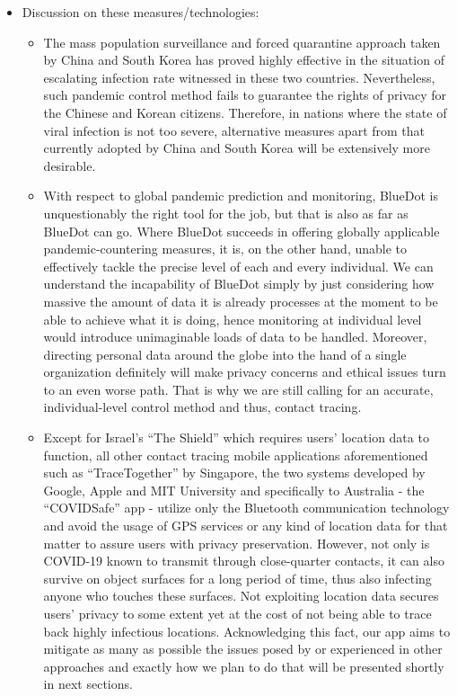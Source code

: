 \begin{itemize}
        \item Discussion on these measures/technologies:
        \begin{itemize}
          \item The mass population surveillance and forced quarantine approach taken by China and South Korea has proved highly effective in the situation of escalating infection rate witnessed in these two countries. Nevertheless, such pandemic control method fails to guarantee the rights of privacy for the Chinese and Korean citizens. Therefore, in nations where the state of viral infection is not too severe, alternative measures apart from that currently adopted by China and South Korea will be extensively more desirable.
          \item With respect to global pandemic prediction and monitoring, BlueDot is unquestionably the right tool for the job, but that is also as far as BlueDot can go. Where BlueDot succeeds in offering globally applicable pandemic-countering measures, it is, on the other hand, unable to effectively tackle the precise level of each and every individual. We can understand the incapability of BlueDot simply by just considering how massive the amount of data it is already processes at the moment to be able to achieve what it is doing, hence monitoring at individual level would introduce unimaginable loads of data to be handled. Moreover, directing personal data around the globe into the hand of a single organization definitely will make privacy concerns and ethical issues turn to an even worse path. That is why we are still calling for an accurate, individual-level control method and thus, contact tracing.
          \item Except for Israel's ``The Shield'' which requires users' location data to function, all other contact tracing mobile applications aforementioned such as ``TraceTogether'' by Singapore, the two systems developed by Google, Apple and MIT University and specifically to Australia - the ``COVIDSafe'' app \parencite{CovidSafe} - utilize only the Bluetooth communication technology and avoid the usage of GPS services or any kind of location data for that matter to assure users with privacy preservation. However, not only is COVID-19 known to transmit through close-quarter contacts, it can also survive on object surfaces for a long period of time, thus also infecting anyone who touches these surfaces. Not exploiting location data secures users' privacy to some extent yet at the cost of not being able to trace back highly infectious locations. Acknowledging this fact, our app aims to mitigate as many as possible the issues posed by or experienced in other approaches and exactly how we plan to do that will be presented shortly in next sections.
        \end{itemize}
      \end{itemize}

